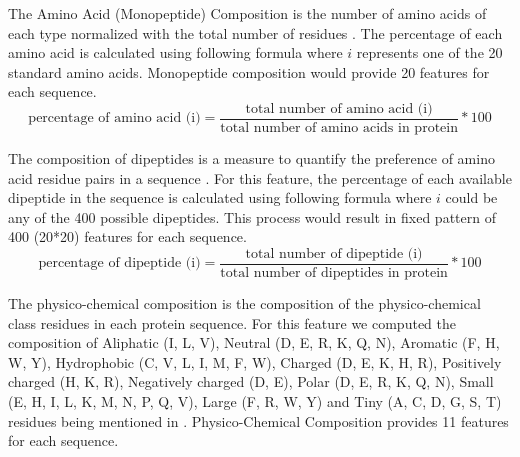     The Amino Acid (Monopeptide) Composition is the number of amino acids of each type normalized with the total number of 
    residues \cite{gromiha2010protein}. The percentage of each amino acid is calculated using following formula where $i$ 
    represents one of the 20 standard amino acids. Monopeptide composition would provide 20 features for each sequence.
    \begin{equation}
        \text{percentage of amino acid (i)} = \frac {\text{total number of amino acid (i)}} {\text{total number of amino acids in protein}} * 100
    \end{equation} 
    
    The composition of dipeptides is a measure to quantify the preference of amino acid residue pairs in a sequence 
    \cite{gromiha2010protein}. For this feature, the percentage of each available dipeptide in the sequence is calculated using 
    following formula where $i$ could be any of the 400 possible dipeptides. This process would result in fixed pattern of 
    400 (20*20) features for each sequence.  
    \begin{equation}
        \text{percentage of dipeptide (i)} = \frac {\text{total number of dipeptide (i)}} {\text{total number of dipeptides in protein}} * 100
    \end{equation}


    The physico-chemical composition is the composition of the physico-chemical class residues in each protein sequence. 
    For this feature we computed the composition of Aliphatic (I, L, V), Neutral (D, E, R, K, Q, N), 
    Aromatic (F, H, W, Y), Hydrophobic (C, V, L, I, M, F, W), Charged (D, E, K, H, R), 
    Positively charged (H, K, R), Negatively charged (D, E), Polar (D, E, R, K, Q, N), Small (E, H, I, L, K, M, N, P, Q, V), 
    Large (F, R, W, Y) and Tiny (A, C, D, G, S, T) residues being mentioned in \cite{mishra2014prediction}. 
    Physico-Chemical Composition provides 11 features for each sequence.\\

